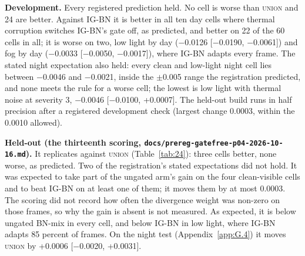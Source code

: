 \documentclass[10pt]{article}
\begin{document}
\textbf{Development.} Every registered prediction held. No cell is worse than \textsc{union} and 24 are better. Against IG-BN it is better in all ten day cells where thermal corruption switches IG-BN's gate off, as predicted, and better on 22 of the 60 cells in all; it is worse on two, low light by day ($-$0.0126 [$-$0.0190, $-$0.0061]) and fog by day ($-$0.0033 [$-$0.0050, $-$0.0017]), where IG-BN adapts every frame. The stated night expectation also held: every clean and low-light night cell lies between $-$0.0046 and $-$0.0021, inside the $\pm$0.005 range the registration predicted, and none meets the rule for a worse cell; the lowest is low light with thermal noise at severity 3, $-$0.0046 [$-$0.0100, +0.0007]. The held-out build runs in half precision after a registered development check (largest change 0.0003, within the 0.0010 allowed).

\textbf{Held-out (the thirteenth scoring, \texttt{docs/\allowbreak{}prereg-gatefree-p04-2026-10-16.md}).} It replicates against \textsc{union} (Table~\ref{tab:24}): three cells better, none worse, as predicted. Two of the registration's stated expectations did not hold. It was expected to take part of the ungated arm's gain on the four clean-visible cells and to beat IG-BN on at least one of them; it moves them by at most 0.0003. The scoring did not record how often the divergence weight was non-zero on those frames, so why the gain is absent is not measured. As expected, it is below ungated BN-mix in every cell, and below IG-BN in low light, where IG-BN adapts 85 percent of frames. On the night test (Appendix~\ref{app:G.4}) it moves \textsc{union} by +0.0006 [$-$0.0020, +0.0031].
\end{document}
